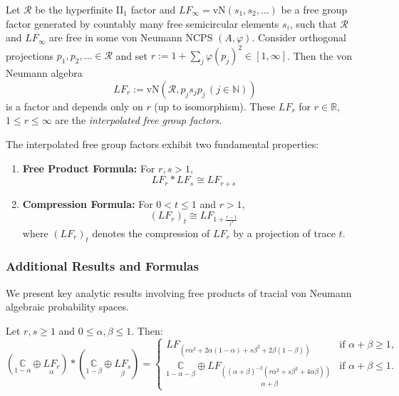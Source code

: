\begin{theorem}\label{LF formula}
    Let $\mathscr{R}$ be the hyperfinite II$_1$ factor and $LF_\infty = \text{vN}(s_1, s_2, \ldots)$ be a free group factor generated by countably many free semicircular elements $s_i$, such that $\mathscr{R}$ and $LF_\infty$ are free   in some von Neumann NCPS $(A, \varphi)$. Consider orthogonal projections $p_1, p_2, \ldots \in \mathscr{R}$ and set $r := 1 + \sum_j \varphi(p_j)^2 \in [1, \infty]$. Then the von Neumann algebra
    \[
    LF_r := \text{vN}(\mathscr{R}, p_j s_j p_j \, (j \in \mathbb{N}))
    \]
    is a factor and depends only on $r$ (up to isomorphism).
    These $LF_r$ for $r \in \mathbb{R}$, $1 \leq r \leq \infty$ are the \emph{interpolated free group factors}.
\end{theorem}

The interpolated free group factors exhibit two fundamental properties:

\begin{enumerate}
    \item \textbf{Free Product Formula:} For $r, s > 1$, 
    \[
    LF_r * LF_s \cong LF_{r + s}
    \]

    \item \textbf{Compression Formula:} For $0 < t \leq 1$ and $r > 1$,
    \[
    (LF_r)_t \cong LF_{1+\frac{r-1}{t^2}}
    \]
    where $(LF_r)_t$ denotes the compression of $LF_r$ by a projection of trace $t$.
\end{enumerate}

\subsubsection*{Additional Results and Formulas}

We present key analytic results involving free products of tracial von Neumann algebraic probability spaces.

\begin{proposition}
Let $r, s \geq 1$ and $0 \leq \alpha, \beta \leq 1$. Then:
\[
\left( \underset{1-\alpha}{\mathbb{C}} \oplus \underset{\alpha}{LF_r} \right) * \left( \underset{1 - \beta}{\mathbb{C}} \oplus \underset{\beta}{LF_s} \right) = 
\begin{cases}
LF_{(r\alpha^2 + 2\alpha(1-\alpha) + s\beta^2 + 2\beta(1-\beta))} & \text{if } \alpha + \beta \geq 1, \\
\underset{1-\alpha-\beta}{\mathbb{C}} \oplus \underset{\alpha+\beta}{LF_{((\alpha + \beta)^{-2}(r\alpha^2 + s\beta^2 + 4\alpha\beta))}} & \text{if } \alpha + \beta \leq 1.
\end{cases}
\]
\end{proposition}

